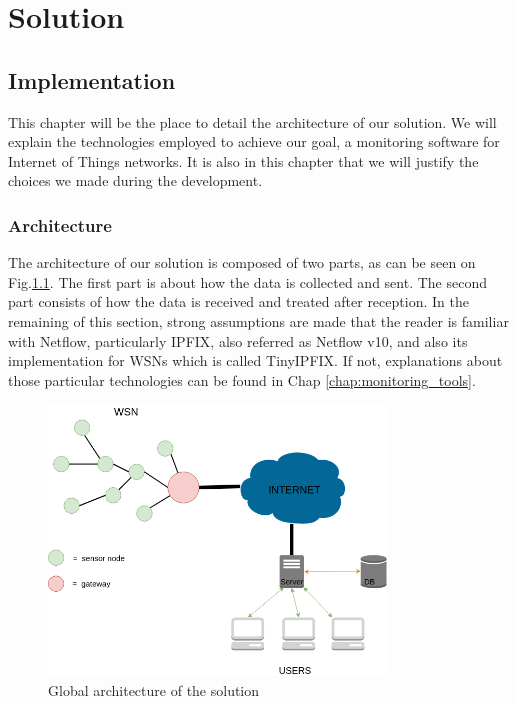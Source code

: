 \part{Solution} \label{part:solution}

\chapter{Implementation}

This chapter will be the place to detail the architecture of our solution. We will explain the technologies employed to achieve our goal, a monitoring software for Internet of Things networks. It is also in this chapter that we will justify the choices we made during the development.

\section{Architecture}

The architecture of our solution is composed of two parts, as can be seen on Fig.\ref{fig:design}. The first part is about how the data is collected and sent. The second part consists of how the data is received and treated after reception. In the remaining of this section, strong assumptions are made that the reader is familiar with Netflow, particularly IPFIX, also referred as Netflow v10, and also its implementation for WSNs which is called TinyIPFIX. If not, explanations about those particular technologies can be found in Chap \ref{chap:monitoring_tools}. \\

\begin{figure}
	\centering
	\includegraphics[width=0.8\textwidth]{res/design.png}
	\caption{Global architecture of the solution}
	\label{fig:design}
\end{figure}

